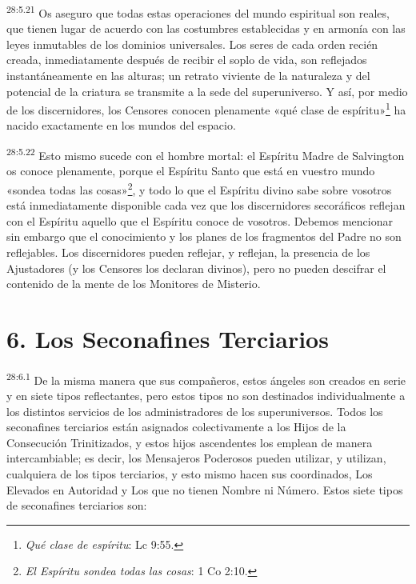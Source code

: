\par
\textsuperscript{28:5.21} Os aseguro que todas estas operaciones del mundo espiritual son reales, que tienen lugar de acuerdo con las costumbres establecidas y en armonía con las leyes inmutables de los dominios universales. Los seres de cada orden recién creada, inmediatamente después de recibir el soplo de vida, son reflejados instantáneamente en las alturas; un retrato viviente de la naturaleza y del potencial de la criatura se transmite a la sede del superuniverso. Y así, por medio de los discernidores, los Censores conocen plenamente «qué clase de espíritu»\footnote{\textit{Qué clase de espíritu}: Lc 9:55.} ha nacido exactamente en los mundos del espacio.

\par
\textsuperscript{28:5.22} Esto mismo sucede con el hombre mortal: el Espíritu Madre de Salvington os conoce plenamente, porque el Espíritu Santo que está en vuestro mundo «sondea todas las cosas»\footnote{\textit{El Espíritu sondea todas las cosas}: 1 Co 2:10.}, y todo lo que el Espíritu divino sabe sobre vosotros está inmediatamente disponible cada vez que los discernidores secoráficos reflejan con el Espíritu aquello que el Espíritu conoce de vosotros. Debemos mencionar sin embargo que el conocimiento y los planes de los fragmentos del Padre no son reflejables. Los discernidores pueden reflejar, y reflejan, la presencia de los Ajustadores (y los Censores los declaran divinos), pero no pueden descifrar el contenido de la mente de los Monitores de Misterio.

\section*{6. Los Seconafines Terciarios}
\par
\textsuperscript{28:6.1} De la misma manera que sus compañeros, estos ángeles son creados en serie y en siete tipos reflectantes, pero estos tipos no son destinados individualmente a los distintos servicios de los administradores de los superuniversos. Todos los seconafines terciarios están asignados colectivamente a los Hijos de la Consecución Trinitizados, y estos hijos ascendentes los emplean de manera intercambiable; es decir, los Mensajeros Poderosos pueden utilizar, y utilizan, cualquiera de los tipos terciarios, y esto mismo hacen sus coordinados, Los Elevados en Autoridad y Los que no tienen Nombre ni Número. Estos siete tipos de seconafines terciarios son:

